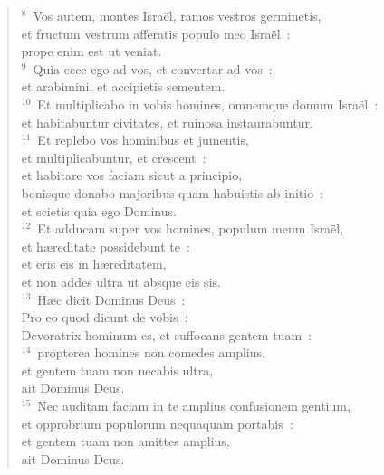 \begin{verse}
${}^{8}$~Vos autem, montes Isra\"el, ramos vestros germinetis,\\ et fructum vestrum afferatis populo meo Isra\"el~:\\ prope enim est ut veniat.\\
${}^{9}$~Quia ecce ego ad vos, et convertar ad vos~:\\ et arabimini, et accipietis sementem.\\
${}^{10}$~Et multiplicabo in vobis homines, omnemque domum Isra\"el~:\\ et habitabuntur civitates, et ruinosa instaurabuntur.\\
${}^{11}$~Et replebo vos hominibus et jumentis,\\ et multiplicabuntur, et crescent~:\\ et habitare vos faciam sicut a principio,\\ bonisque donabo majoribus quam habuistis ab initio~:\\ et scietis quia ego Dominus.\\
${}^{12}$~Et adducam super vos homines, populum meum Isra\"el,\\ et h\ae reditate possidebunt te~:\\ et eris eis in h\ae reditatem,\\ et non addes ultra ut absque eis sis.\\
${}^{13}$~H\ae c dicit Dominus Deus~:\\ Pro eo quod dicunt de vobis~:\\ Devoratrix hominum es, et suffocans gentem tuam~:\\
${}^{14}$~propterea homines non comedes amplius,\\ et gentem tuam non necabis ultra,\\ ait Dominus Deus.\\
${}^{15}$~Nec auditam faciam in te amplius confusionem gentium,\\ et opprobrium populorum nequaquam portabis~:\\ et gentem tuam non amittes amplius,\\ ait Dominus Deus.\end{verse}


